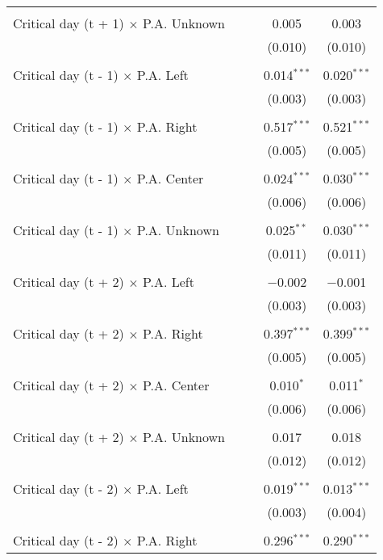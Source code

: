 \documentclass[
]{article}
\begin{document}
\begin{table}[!htbp]
{\begin{tabular}{@{\extracolsep{5pt}}lcccc}
  & & & & \\ 
 Critical day (t + 1) $\times$ P.A. Unknown &  &  & 0.005 & 0.003 \\ 
  &  &  & (0.010) & (0.010) \\ 
  & & & & \\ 
 Critical day (t - 1) $\times$ P.A. Left &  &  & 0.014$^{***}$ & 0.020$^{***}$ \\ 
  &  &  & (0.003) & (0.003) \\ 
  & & & & \\ 
 Critical day (t - 1) $\times$ P.A. Right &  &  & 0.517$^{***}$ & 0.521$^{***}$ \\ 
  &  &  & (0.005) & (0.005) \\ 
  & & & & \\ 
 Critical day (t - 1) $\times$ P.A. Center &  &  & 0.024$^{***}$ & 0.030$^{***}$ \\ 
  &  &  & (0.006) & (0.006) \\ 
  & & & & \\ 
 Critical day (t - 1) $\times$ P.A. Unknown &  &  & 0.025$^{**}$ & 0.030$^{***}$ \\ 
  &  &  & (0.011) & (0.011) \\ 
  & & & & \\ 
 Critical day (t + 2) $\times$ P.A. Left &  &  & $-$0.002 & $-$0.001 \\ 
  &  &  & (0.003) & (0.003) \\ 
  & & & & \\ 
 Critical day (t + 2) $\times$ P.A. Right &  &  & 0.397$^{***}$ & 0.399$^{***}$ \\ 
  &  &  & (0.005) & (0.005) \\ 
  & & & & \\ 
 Critical day (t + 2) $\times$ P.A. Center &  &  & 0.010$^{*}$ & 0.011$^{*}$ \\ 
  &  &  & (0.006) & (0.006) \\ 
  & & & & \\ 
 Critical day (t + 2) $\times$ P.A. Unknown &  &  & 0.017 & 0.018 \\ 
  &  &  & (0.012) & (0.012) \\ 
  & & & & \\ 
 Critical day (t - 2) $\times$ P.A. Left &  &  & 0.019$^{***}$ & 0.013$^{***}$ \\ 
  &  &  & (0.003) & (0.004) \\ 
  & & & & \\ 
 Critical day (t - 2) $\times$ P.A. Right &  &  & 0.296$^{***}$ & 0.290$^{***}$ \\ 

\end{tabular}}
\end{table}
\end{document}
